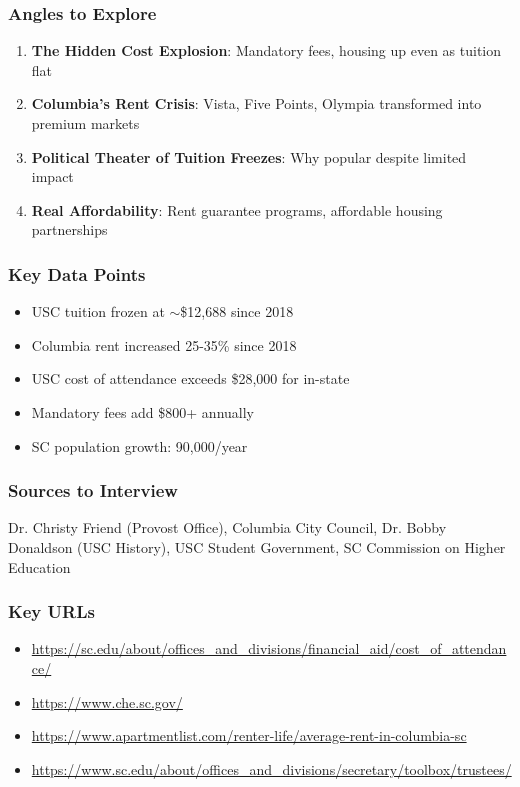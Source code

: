 \documentclass[11pt,letterpaper]{article}
\begin{document}
\subsubsection*{Angles to Explore}
\begin{enumerate}[noitemsep]
    \item \textbf{The Hidden Cost Explosion}: Mandatory fees, housing up even as tuition flat
    \item \textbf{Columbia's Rent Crisis}: Vista, Five Points, Olympia transformed into premium markets
    \item \textbf{Political Theater of Tuition Freezes}: Why popular despite limited impact
    \item \textbf{Real Affordability}: Rent guarantee programs, affordable housing partnerships
\end{enumerate}

\subsubsection*{Key Data Points}
\begin{itemize}[noitemsep]
    \item USC tuition frozen at $\sim$\$12,688 since 2018
    \item Columbia rent increased 25-35\% since 2018
    \item USC cost of attendance exceeds \$28,000 for in-state
    \item Mandatory fees add \$800+ annually
    \item SC population growth: 90,000/year
\end{itemize}

\subsubsection*{Sources to Interview}
Dr. Christy Friend (Provost Office), Columbia City Council, Dr. Bobby Donaldson (USC History), USC Student Government, SC Commission on Higher Education

\subsubsection*{Key URLs}
\begin{itemize}[noitemsep]
    \item \url{https://sc.edu/about/offices_and_divisions/financial_aid/cost_of_attendance/}
    \item \url{https://www.che.sc.gov/}
    \item \url{https://www.apartmentlist.com/renter-life/average-rent-in-columbia-sc}
    \item \url{https://www.sc.edu/about/offices_and_divisions/secretary/toolbox/trustees/}
\end{itemize}
\end{document}
